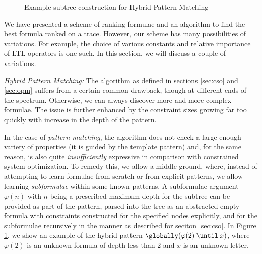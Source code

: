 \begin{figure}[t]
    \centering
    \caption{Example subtree construction for Hybrid Pattern Matching}
\label{fig:subtree}
\end{figure}

We have presented a scheme of ranking formulae and an algorithm to find the best
formula ranked on a trace.
%
However, our scheme has many possibilities of variations. For example, the
choice of various constants and relative importance of LTL operators is one
such. 
%
In this section, we will discuss a couple of variations.

\emph{Hybrid Pattern Matching: }
The algorithm as defined in  sections \ref{sec:cso} and \ref{sec:opm} suffers
from a certain common drawback, though at different ends of the spectrum.
%
Otherwise, we can always discover more and more complex formulae.
%
The issue is further enhanced by the constraint sizes growing far too  quickly
with increase in the depth of the pattern. 

In the case of  \emph{pattern matching}, the algorithm does not check a large
enough variety of properties (it is guided by the template pattern) and, for the
same reason,  is also quite \emph{insufficiently} expressive in comparison with
constrained system optimization. 
%
To remedy this, we allow a middle ground, where, instead of attempting to learn
formulae from scratch or from explicit patterns, we allow learning
\emph{subformulae} within some known patterns.
%
A subformulae argument $\varphi(n)$ with $n$ being a prescribed maximum depth for
the subtree can be provided as part of the pattern, parsed into the tree as an
abstracted empty formula with constraints constructed for the specified nodes
explicitly, and for the subformulae recursively in the manner as described for
seciton \ref{sec:cso}. In Figure \ref{fig:subtree}, we show an example of the
hybrid pattern $\globally (\varphi(2) \: \until \: x)$, where $\varphi(2)$ is an
unknown formula of depth less than $2$ and $x$ is an unknown letter.

